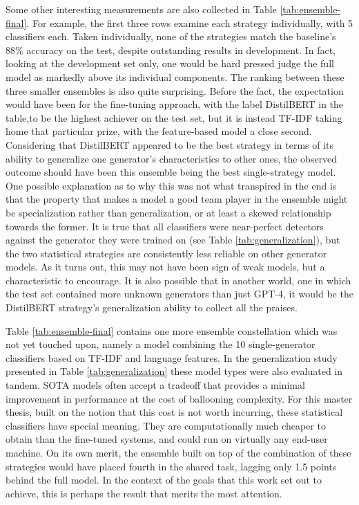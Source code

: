 Some other interesting measurements are also collected in Table \ref{tab:ensemble-final}.
For example, the first three rows examine each strategy individually, with 5 classifiers each.
Taken individually, none of the strategies match the baseline's 88\% accuracy on the test, despite outstanding results in development.
In fact, looking at the development set only, one would be hard pressed judge the full model as markedly above its individual components.
The ranking between these three smaller ensembles is also quite surprising.
Before the fact, the expectation would have been for the fine-tuning approach, with the label DistilBERT in the table,to be the highest achiever on the test set, but it is instead TF-IDF taking home that particular prize, with the feature-based model a close second.
Considering that DistilBERT appeared to be the best strategy in terms of its ability to generalize one generator's characteristics to other ones, the observed outcome should have been this ensemble being the best single-strategy model.
One possible explanation as to why this was not what transpired in the end is that the property that makes a model a good team player in the ensemble might be specialization rather than generalization, or at least a skewed relationship towards the former.
It is true that all classifiers were near-perfect detectors against the generator they were trained on (see Table \ref{tab:generalization}), but the two statistical strategies are consistently less reliable on other generator models.
As it turns out, this may not have been sign of weak models, but a characteristic to encourage.
It is also possible that in another world, one in which the test set contained more unknown generators than just GPT-4, it would be the DistilBERT strategy's generalization ability to collect all the praises.

Table \ref{tab:ensemble-final} contains one more ensemble constellation which was not yet touched upon, namely a model combining the 10 single-generator classifiers based on TF-IDF and language features.
In the generalization study presented in Table \ref{tab:generalization} these model types were also evaluated in tandem.
SOTA models often accept a tradeoff that provides a minimal improvement in performance at the cost of ballooning complexity.
For this master thesis, built on the notion that this cost is not worth incurring, these statistical classifiers have special meaning.
They are computationally much cheaper to obtain than the fine-tuned systems, and could run on virtually any end-user machine.
On its own merit, the ensemble built on top of the combination of these strategies would have placed fourth in the shared task, lagging only 1.5 points behind the full model.
In the context of the goals that this work set out to achieve, this is perhaps the result that merits the most attention.

